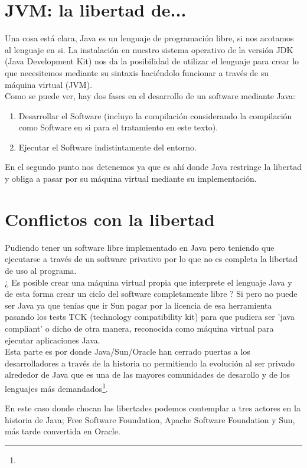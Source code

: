 \documentclass[11pt]{scrartcl}
\begin{document}
\section{JVM: la libertad de...}

Una cosa está clara, Java es un lenguaje de programación libre, si nos acotamos al lenguaje en si. La instalación en nuestro sistema operativo de la versión JDK (Java Development Kit) nos da la posibilidad de utilizar el lenguaje para crear lo que necesitemos mediante su sintaxis haciéndolo funcionar a través de su máquina virtual (JVM).\\
Como se puede ver, hay dos fases en el desarrollo de un software mediante Java:
\begin{enumerate}
\item Desarrollar el Software (incluyo la compilación considerando la compilación como Software en si para el tratamiento en este texto).
\item Ejecutar el Software indistintamente del entorno.
\end{enumerate}

En el segundo punto nos detenemos ya que es ahí donde Java restringe la libertad y obliga a pasar por su máquina virtual mediante su implementación.

\section{Conflictos con la libertad}

Pudiendo tener un software libre implementado en Java pero teniendo que ejecutarse a través de un software privativo por lo que no es completa la libertad de uso al programa.\\
¿ Es posible crear una máquina virtual propia que interprete el lenguaje Java y de esta forma crear un ciclo del software completamente libre ? Si pero no puede ser Java ya que tenías que ir Sun pagar por la licencia de esa herramienta pasando los tests TCK (technology compatibility kit) para que pudiera ser 'java compliant' o dicho de otra manera, reconocida como máquina virtual para ejecutar aplicaciones Java.\\
Esta parte es por donde Java/Sun/Oracle han cerrado puertas a los desarrolladores a través de la historia no permitiendo la evolución al ser privado alrededor de Java que es una de las mayores comunidades de desarollo y de los lenguajes más demandados\footnote{}.%

En este caso donde chocan las libertades podemos contemplar a tres actores en la historia de Java; Free Software Foundation, Apache Software Foundation y Sun, más tarde convertida en Oracle.
\end{document}
